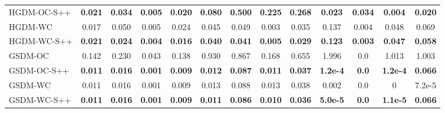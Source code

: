 \documentclass{article}
\begin{document}
\begin{table}[!t]
{\begin{tabular}{lcccccccccccc}
HGDM-OC-S++ & \textbf{0.021} & \textbf{0.034} & \textbf{0.005} & \textbf{0.020} & \textbf{0.080} & \textbf{0.500} & \textbf{0.225} & \textbf{0.268} & \textbf{0.023} & \textbf{0.034} & \textbf{0.004} & \textbf{0.020} \\
HGDM-WC & 0.017 & 0.050 & 0.005 & 0.024 & 0.045 & 0.049 & 0.003 & 0.035 & 0.137 & 0.004 & 0.048 & 0.069 \\
HGDM-WC-S++ & \textbf{0.021} & \textbf{0.024} & \textbf{0.004} & \textbf{0.016} & \textbf{0.040} & \textbf{0.041} & \textbf{0.005} & \textbf{0.029} & \textbf{0.123} & \textbf{0.003} & \textbf{0.047} & \textbf{0.058} \\
\midrule
GSDM-OC & 0.142 & 0.230 & 0.043 & 0.138 & 0.930 & 0.867 & 0.168 & 0.655 & 1.996 & 0.0 & 1.013 & 1.003 \\
GSDM-OC-S++ & \textbf{0.011} & \textbf{0.016} & \textbf{0.001} & \textbf{0.009} & \textbf{0.012} & \textbf{0.087} & \textbf{0.011} & \textbf{0.037} & \textbf{1.2e-4} & \textbf{0.0} & \textbf{1.2e-4} & \textbf{0.066} \\
GSDM-WC & 0.011 & 0.016 & 0.001 & 0.009 & 0.013 & 0.088 & 0.013 & 0.038 & 0.002 & 0.0 & 0 & 7.2e-5 \\
GSDM-WC-S++ & \textbf{0.011} & \textbf{0.016} & \textbf{0.001} & \textbf{0.009} & \textbf{0.011} & \textbf{0.086} & \textbf{0.010} & \textbf{0.036} & \textbf{5.0e-5} & \textbf{0.0} & \textbf{1.1e-5} & \textbf{0.066} \\
\bottomrule
\end{tabular}%
}
\end{table}
\end{document}
